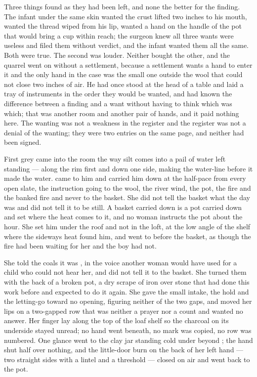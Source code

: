 Three things found as they had been left, and none the better for the finding. The infant under the same skin wanted the crust lifted two inches to his mouth, wanted the thread wiped from his lip, wanted a hand on the handle of the pot that would bring a cup within reach; the surgeon knew all three wants were useless and filed them without verdict, and the infant wanted them all the same. Both were true. The second was louder. Neither bought the other, and the quarrel went on without a settlement, because a settlement wants a hand to enter it and the only hand in the case was the small one outside the wool that could not close two inches of air. He had once stood at the head of a table and laid a tray of instruments in the order they would be wanted, and had known the difference between a finding and a want without having to think which was which; that was another room and another pair of hands, and it paid nothing here. The wanting was not a weakness in the register and the register was not a denial of the wanting; they were two entries on the same page, and neither had been signed.

\scenebreak

First grey came into the room the way silt comes into a pail of water left standing --- along the rim first and down one side, making the water-line before it made the water.  came to him and carried him down  at the half-pace from every open slate, the instruction going to the wool, the river wind, the pot, the fire and the banked fire and never to the basket. She did not tell the basket what the day was and did not tell it to be still. A basket carried down is a pot carried down and set where the heat comes to it, and no woman instructs the pot about the hour. She set him under the roof and not in the loft, at the low angle of the shelf where the sideways heat found him, and went to  before the basket, as though the fire had been waiting for her and the boy had not.

She told the coals it was , in the voice another woman would have used for a child who could not hear her, and did not tell it to the basket. She turned them with the back of a broken pot, a dry scrape of iron over stone that had done this work before and expected to do it again. She gave the small intake, the hold and the letting-go toward no opening, figuring neither of the two gaps, and moved her lips on a two-gapped row that was neither a prayer nor a count and wanted no answer. Her finger lay along the top of the loaf shelf so the charcoal on its underside stayed unread; no hand went beneath, no mark was copied, no row was numbered. One glance went to the clay jar standing cold under  beyond ; the hand shut half over nothing, and the little-door burn on the back of her left hand --- two straight sides with a lintel and a threshold --- closed on air and went back to the pot.

